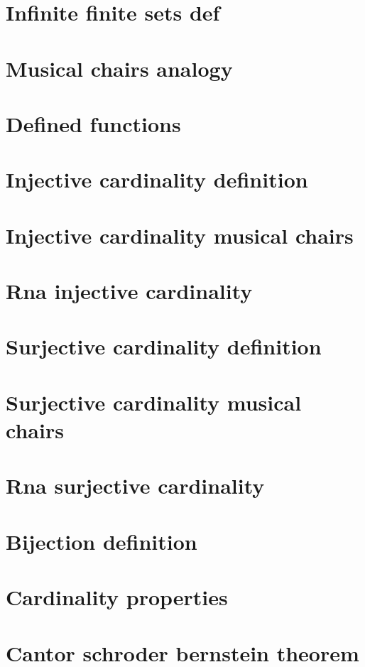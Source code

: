 \section*{Infinite finite sets def}

\vfill
\section*{Musical chairs analogy}

\vfill
\section*{Defined functions}

\vfill
\section*{Injective cardinality definition}

\vfill
\section*{Injective cardinality musical chairs}

\vfill
\section*{Rna injective cardinality}

\vfill
\section*{Surjective cardinality definition}

\vfill
\section*{Surjective cardinality musical chairs}

\vfill
\section*{Rna surjective cardinality}

\vfill
\section*{Bijection definition}

\vfill
\section*{Cardinality properties}

\vfill
\section*{Cantor schroder bernstein theorem}

\vfill
